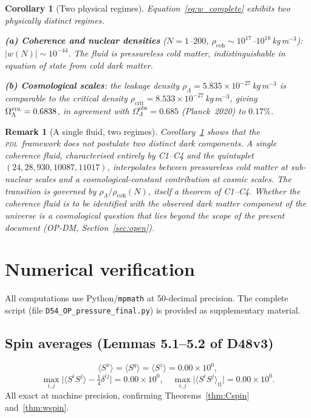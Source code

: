\documentclass[12pt,a4paper]{article}
\newtheorem{corollary}[theorem]{Corollary}
\newtheorem{remark}[theorem]{Remark}
\newcommand{\PDL}{\textsc{pdl}}
\newcommand{\rhocoh}{\rho_{\mathrm{coh}}}
\newcommand{\rhoLambda}{\rho_\Lambda}
\newcommand{\quintuplet}{(24,28,930,10087,11017)}
\newcommand{\OmegaL}{\Omega_\Lambda}
\begin{document}
\begin{corollary}[Two physical regimes]
\label{cor:regimes}
Equation~\eqref{eq:w_complete} exhibits two physically distinct regimes.

\medskip\noindent\textbf{(a) Coherence and nuclear densities} ($N = 1$--$200$, $\rhocoh \sim 10^{17}$--$10^{18}$\,kg\,m$^{-3}$): $|w(N)| \sim 10^{-44}$. The fluid is pressureless cold matter, indistinguishable in equation of state from cold dark matter.

\medskip\noindent\textbf{(b) Cosmological scales}: the leakage density $\rhoLambda = 5.835\times10^{-27}$\,kg\,m$^{-3}$ is comparable to the critical density $\rho_{\mathrm{crit}} = 8.533\times10^{-27}$\,kg\,m$^{-3}$, giving $\OmegaL^{\PDL} = 0.6838$, in agreement with $\OmegaL^{\mathrm{obs}} = 0.685$ (Planck~2020) to $0.17\%$.
\end{corollary}

\begin{remark}[A single fluid, two regimes]
Corollary~\ref{cor:regimes} shows that the \PDL\ framework does not postulate two distinct dark components. A single coherence fluid, characterised entirely by C1--C4 and the quintuplet $\quintuplet$, interpolates between pressureless cold matter at sub-nuclear scales and a cosmological-constant contribution at cosmic scales. The transition is governed by $\rhoLambda/\rhocoh(N)$, itself a theorem of C1--C4. Whether the coherence fluid is to be identified with the observed dark matter component of the universe is a cosmological question that lies beyond the scope of the present document (OP-DM, Section~\ref{sec:open}).
\end{remark}

\section{Numerical verification}
\label{sec:numerics}

All computations use Python/\texttt{mpmath} at 50-decimal precision. The complete script (file \texttt{D54\_OP\_pressure\_final.py}) is provided as supplementary material.

\subsection{Spin averages (Lemmas 5.1--5.2 of D48v3)}

\begin{equation}
\langle S^x\rangle = \langle S^y\rangle = \langle S^z\rangle = 0.00\times10^0,
\end{equation}
\begin{equation}
\max_{i,j}\bigl|\langle S^i S^j\rangle - \tfrac{1}{4}\delta^{ij}\bigr| = 0.00\times10^0,\quad \max_{i,j}\bigl|\langle S^iS^j\rangle_{\mathrm{tl}}\bigr| = 0.00\times10^0.
\end{equation}
All exact at machine precision, confirming Theorems~\ref{thm:Cspin} and~\ref{thm:wspin}.
\end{document}
